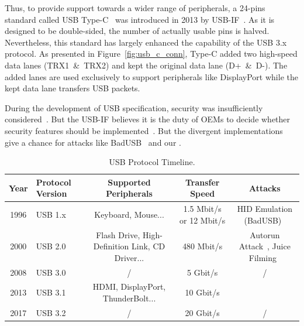 Thus, to provide support towards a wider range of peripherals, a 24-pins
standard called \ac{USB} Type-C~\cite{typec} was introduced in 2013 by \ac{USB}-IF~\cite{usbif}. As it is designed to be double-sided, the number of actually usable
pins is halved. Nevertheless, this standard has largely enhanced the capability
of the \ac{USB} 3.x protocol. As presented in Figure~\ref{fig:usb_c_conn}, Type-C added
two high-speed data lanes \mbox{(TRX1 \& TRX2)} and kept the original data lane \mbox{(D+ \&
D-)}. The added lanes are used exclusively to support peripherals like
DisplayPort while the kept data lane transfers \ac{USB} packets.

During the development of \ac{USB} specification, security was insufficiently considered~\cite{sok}. But 
the \ac{USB}-IF believes it is the duty of \acp{OEM}
to decide whether security features should be implemented~\cite{usbsec}. But the divergent implementations give a chance for attacks like
BadUSB~\cite{rubber} and our \tool.

\begin{table}
\begin{tabular}{|c|l|c|c|c|}
	\hline
	\textbf{Year} & \textbf{Protocol Version} & \textbf{Supported Peripherals} & \textbf{Transfer Speed} & \textbf{Attacks} \\
	\hline
	1996 & \ac{USB} 1.x~\cite{usb10,usb11} & Keyboard, Mouse... & 1.5 Mbit/s or 12 Mbit/s & \ac{HID} Emulation (BadUSB)~\cite{badusb} \\
	\hline
	2000 & \ac{USB} 2.0~\cite{usb20} & Flash Drive, High-Definition Link, CD Driver... & 480 Mbit/s & Autorun Attack~\cite{duqu}, Juice Filming~\cite{JFC,JFCImpact} \\
	\hline
	2008 & \ac{USB} 3.0~\cite{usb30} & / & 5 Gbit/s & / \\
	\hline
	2013 & \ac{USB} 3.1~\cite{usb31} & HDMI, DisplayPort, ThunderBolt... & 10 Gbit/s & \tool \\
	\hline
	2017 & \ac{USB} 3.2~\cite{usb32} & / & 20 Gbit/s & / \\
	\hline
\end{tabular}
	\linebreak
\caption{\ac{USB} Protocol Timeline.}
\label{table:usb_timeline}
\end{table}
